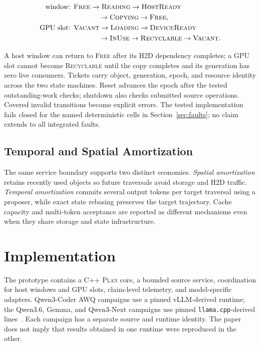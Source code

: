 \documentclass[letterpaper,twocolumn,10pt]{article}
\newcommand{\Plan}{\textsc{Plan}\xspace}
\begin{document}
\begin{align*}
\text{window: }&\textsc{Free}\rightarrow\textsc{Reading}
 \rightarrow\textsc{HostReady}\\
&\hspace{3.6em}\rightarrow\textsc{Copying}\rightarrow\textsc{Free},\\
\text{GPU slot: }&\textsc{Vacant}\rightarrow\textsc{Loading}
 \rightarrow\textsc{DeviceReady}\\
&\hspace{3.6em}\rightarrow\textsc{InUse}\rightarrow\textsc{Recyclable}
 \rightarrow\textsc{Vacant}.
\end{align*}

A host window can return to \textsc{Free} after its H2D dependency completes;
a GPU slot cannot become \textsc{Recyclable} until the copy completes and its
generation has zero live consumers.  Tickets carry object, generation, epoch,
and resource identity across the two state machines.  Reset advances the epoch
after the tested outstanding-work checks; shutdown also checks submitted source
operations.  Covered invalid transitions become explicit errors.  The tested
implementation fails closed for the named deterministic cells in
Section~\ref{sec:faults}; no claim extends to all integrated faults.

\subsection{Temporal and Spatial Amortization}

The same service boundary supports two distinct economies.  \emph{Spatial
amortization} retains recently used objects so future traversals avoid storage
and H2D traffic.  \emph{Temporal amortization} commits several output tokens
per target traversal using a proposer, while exact state rebasing preserves the
target trajectory.  Cache capacity and multi-token acceptance are reported as
different mechanisms even when they share storage and state infrastructure.

\section{Implementation}
\label{sec:implementation}

The prototype contains a C++ \Plan core, a bounded source service, coordination
for host windows and GPU slots, claim-level telemetry, and model-specific
adapters.  Qwen3-Coder AWQ campaigns use a pinned vLLM-derived runtime; the
Qwen3.6, Gemma, and Qwen3-Next campaigns use pinned \texttt{llama.cpp}-derived
lines~\cite{llamacpp}.  Each campaign has a separate source and runtime identity.
The paper does not imply that results obtained in one runtime were reproduced
in the other.
\end{document}
